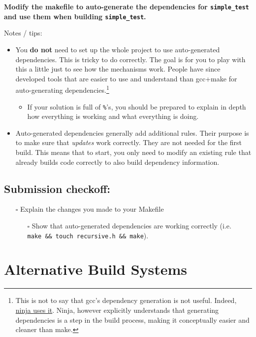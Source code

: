 \documentclass{article}
\begin{document}
\textbf{Modify the makefile to auto-generate the dependencies for
  \texttt{simple\_test} and use them when building \texttt{simple\_test}.}

Notes / tips:
\begin{itemize}
  \item You \textbf{do not} need to set up the whole project to use
    auto-generated dependencies. This is tricky to do correctly.
    The goal is for you to play with this a little just to see how the
    mechanisms work. People have since developed tools that are easier to use
    and understand than gcc+make for auto-generating dependencies.\footnote{
      This is not to say that gcc's dependency generation is not useful.
      Indeed, \href{https://ninja-build.org/manual.html\#ref_headers}{ninja
        uses it}. Ninja, however explicitly understands that generating
      dependencies is a step in the build process, making it conceptually
      easier and cleaner than make.
    }
    \begin{itemize}
      \item If your solution is full of \texttt{\%}'s, you should be prepared
        to explain in depth how everything is working and what everything is
        doing.
    \end{itemize}
  \item Auto-generated dependencies generally add additional rules. Their
    purpose is to make sure that \emph{updates} work correctly. They are not
    needed for the first build. This means that to start, you only need to
    modify an existing rule that already builds code correctly to also build
    dependency information.
\end{itemize}

\subsection*{Submission checkoff:}
\begin{itemize}
  \item[$\square$] Explain the changes you made to your Makefile
    \begin{itemize}
      \item[$\square$] Show that auto-generated dependencies are working
        correctly (i.e. \texttt{make~\&\&~touch~recursive.h~\&\&~make}).
    \end{itemize}
\end{itemize}


\newpage
\section{Alternative Build Systems}
\end{document}
